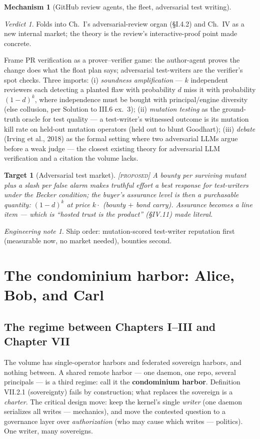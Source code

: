 \documentclass[11pt,a4paper]{article}
\newtheorem{target}{Target}[section]
\theoremstyle{definition}
\newtheorem{mech}{Mechanism}
\theoremstyle{remark}
\newtheorem*{verdict}{Verdict}
\newtheorem*{note}{Engineering note}
\newcommand{\grade}[1]{\textsc{[#1]}}
\begin{document}
\begin{mech}[GitHub review agents, the fleet, adversarial test writing]
\begin{verdict} Folds into Ch.~I's adversarial-review organ (\S I.4.2) and Ch.~IV as a new internal market; the theory is the review's interactive-proof point made concrete. \end{verdict}
Frame PR verification as a prover--verifier game: the author-agent proves the change does what the float plan says; adversarial test-writers are the verifier's spot checks. Three imports: (i) \emph{soundness amplification} --- $k$ independent reviewers each detecting a planted flaw with probability $d$ miss it with probability $(1-d)^k$, where independence must be bought with principal/engine diversity (else collusion, per Solution to III.6 ex.~3); (ii) \emph{mutation testing} as the ground-truth oracle for test quality --- a test-writer's witnessed outcome is its mutation kill rate on held-out mutation operators (held out to blunt Goodhart); (iii) \emph{debate} (Irving et al., 2018) as the formal setting where two adversarial LLMs argue before a weak judge --- the closest existing theory for adversarial LLM verification and a citation the volume lacks.
\begin{target}[Adversarial test market]\grade{proposed} A bounty per surviving mutant plus a slash per false alarm makes truthful effort a best response for test-writers under the Becker condition; the buyer's assurance level is then a purchasable quantity: $(1-d)^k$ at price $k \cdot$ (bounty $+$ bond carry). Assurance becomes a line item --- which is ``hosted trust is the product'' (\S IV.11) made literal. \end{target}
\begin{note} Ship order: mutation-scored test-writer reputation first (measurable now, no market needed), bounties second. \end{note}
\end{mech}

\section{The condominium harbor: Alice, Bob, and Carl}\label{sec:condo}

\subsection{The regime between Chapters I--III and Chapter VII}
The volume has single-operator harbors and federated sovereign harbors, and nothing between. A shared remote harbor --- one daemon, one repo, several principals --- is a third regime: call it the \textbf{condominium harbor}. Definition VII.2.1 (sovereignty) fails by construction; what replaces the sovereign is a \emph{charter}. The critical design move: keep the kernel's single \emph{writer} (one daemon serializes all writes --- mechanics), and move the contested question to a governance layer over \emph{authorization} (who may cause which writes --- politics). One writer, many sovereigns.
\end{document}
